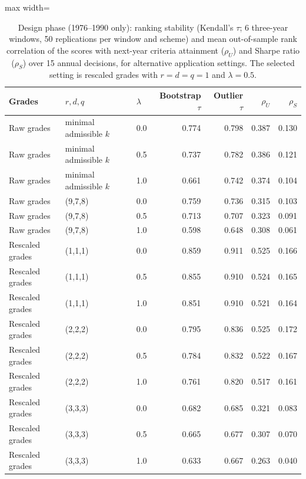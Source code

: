 \begin{table}[!htbp]
\centering
\footnotesize
\caption{Design phase (1976--1990 only): ranking stability (Kendall's $\tau$; 6 three-year windows, 50 replications per window and scheme) and mean out-of-sample rank correlation of the scores with next-year criteria attainment ($\rho_U$) and Sharpe ratio ($\rho_S$) over 15 annual decisions, for alternative application settings. The selected setting is rescaled grades with $r=d=q=1$ and $\lambda=0.5$.}\label{tab:design}
\begin{adjustbox}{max width=\textwidth}
\begin{tabular}{lllrrrr}
\toprule
Grades & $r,d,q$ & $\lambda$ & Bootstrap $\tau$ & Outlier $\tau$ & $\rho_U$ & $\rho_S$ \\
\midrule
Raw grades & minimal admissible $k$ & 0.0 & 0.774 & 0.798 & 0.387 & 0.130 \\
Raw grades & minimal admissible $k$ & 0.5 & 0.737 & 0.782 & 0.386 & 0.121 \\
Raw grades & minimal admissible $k$ & 1.0 & 0.661 & 0.742 & 0.374 & 0.104 \\
Raw grades & (9,7,8) & 0.0 & 0.759 & 0.736 & 0.315 & 0.103 \\
Raw grades & (9,7,8) & 0.5 & 0.713 & 0.707 & 0.323 & 0.091 \\
Raw grades & (9,7,8) & 1.0 & 0.598 & 0.648 & 0.308 & 0.061 \\
Rescaled grades & (1,1,1) & 0.0 & 0.859 & 0.911 & 0.525 & 0.166 \\
Rescaled grades & (1,1,1) & 0.5 & 0.855 & 0.910 & 0.524 & 0.165 \\
Rescaled grades & (1,1,1) & 1.0 & 0.851 & 0.910 & 0.521 & 0.164 \\
Rescaled grades & (2,2,2) & 0.0 & 0.795 & 0.836 & 0.525 & 0.172 \\
Rescaled grades & (2,2,2) & 0.5 & 0.784 & 0.832 & 0.522 & 0.167 \\
Rescaled grades & (2,2,2) & 1.0 & 0.761 & 0.820 & 0.517 & 0.161 \\
Rescaled grades & (3,3,3) & 0.0 & 0.682 & 0.685 & 0.321 & 0.083 \\
Rescaled grades & (3,3,3) & 0.5 & 0.665 & 0.677 & 0.307 & 0.070 \\
Rescaled grades & (3,3,3) & 1.0 & 0.633 & 0.667 & 0.263 & 0.040 \\
\bottomrule
\end{tabular}
\end{adjustbox}
\end{table}
